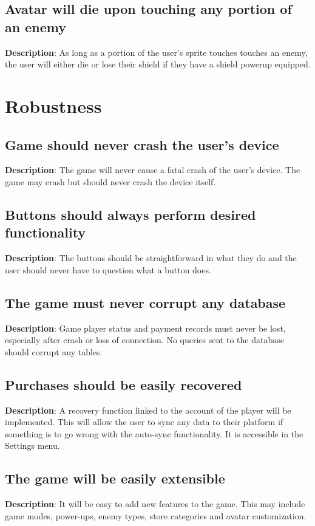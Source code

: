 \subsection{Avatar will die upon touching any portion of an enemy}
\textbf{Description}: As long as a portion of the user\textquoteright{}s sprite
touches touches an enemy, the user will either die or lose their shield
if they have a shield powerup equipped.

\section{Robustness}
\renewcommand\thesubsection{ROB-%
\ifnum\value{subsection}<10 0\fi
\arabic{subsection}}
\subsection{Game should never crash the user\textquoteright{}s device}
\textbf{Description}: The game will never cause a fatal crash of the user\textquoteright{}s
device. The game may crash but should never crash the device itself.

\subsection{Buttons should always perform desired functionality}
\textbf{Description}: The buttons should be straightforward in what they do
and the user should never have to question what a button does.

\subsection{The game must never corrupt any database}
\textbf{Description}: Game player status and payment records must never be
lost, especially after crash or loss of connection. No queries sent
to the database should corrupt any tables.

\subsection{Purchases should be easily recovered}
\textbf{Description}: A recovery function linked to the account of the player
will be implemented. This will allow the user to sync any data to
their platform if something is to go wrong with the auto-sync functionality.
It is accessible in the Settings menu.

\subsection{The game will be easily extensible}
\textbf{Description}: It will be easy to add new features to the game. This
may include game modes, power-ups, enemy types, store categories and
avatar customization.

